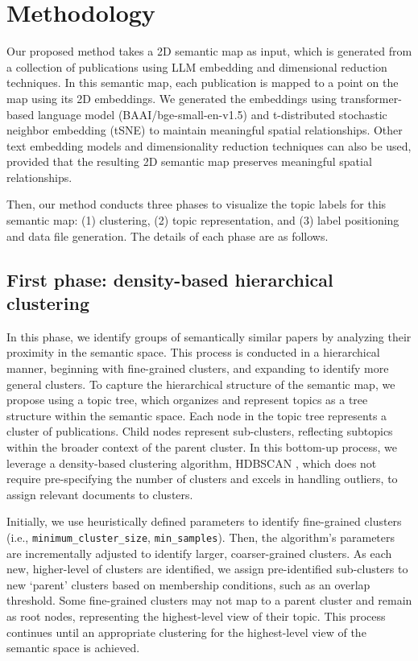 \documentclass{vgtc}                          %
\begin{document}
\section{Methodology}

Our proposed method takes a 2D semantic map as input, which is generated from a collection of publications using LLM embedding and dimensional reduction techniques. In this semantic map, each publication is mapped to a point on the map using its 2D embeddings. We generated the embeddings using transformer-based language model \cite{BAAI2023} (BAAI/bge-small-en-v1.5) and t-distributed stochastic neighbor embedding (tSNE) \cite{vanderMaaten2008} to maintain meaningful spatial relationships. Other text embedding models and dimensionality reduction techniques can also be used, provided that the resulting 2D semantic map preserves meaningful spatial relationships.

Then, our method conducts three phases to visualize the topic labels for this semantic map: (1) clustering, (2) topic representation, and (3) label positioning and data file generation. The details of each phase are as follows.

\subsection{First phase: density-based hierarchical clustering}

In this phase, we identify groups of semantically similar papers by analyzing their proximity in the semantic space. This process is conducted in a hierarchical manner, beginning with fine-grained clusters, and expanding to identify more general clusters. To capture the hierarchical structure of the semantic map, we propose using a topic tree, which organizes and represent topics as a tree structure within the semantic space. Each node in the topic tree represents a cluster of publications. Child nodes represent sub-clusters, reflecting subtopics within the broader context of the parent cluster. In this bottom-up process, we leverage a density-based clustering algorithm, HDBSCAN \cite{McInnes2017}, which does not require pre-specifying the number of clusters and excels in handling outliers, to assign relevant documents to clusters.

Initially, we use heuristically defined parameters to identify fine-grained clusters (i.e., \texttt{minimum\_cluster\_size}, \texttt{min\_samples}). Then, the algorithm's parameters are incrementally adjusted to identify larger, coarser-grained clusters. As each new, higher-level of clusters are identified, we assign pre-identified sub-clusters to new `parent' clusters based on membership conditions, such as an overlap threshold. Some fine-grained clusters may not map to a parent cluster and remain as root nodes, representing the highest-level view of their topic. This process continues until an appropriate clustering for the highest-level view of the semantic space is achieved.
\end{document}
